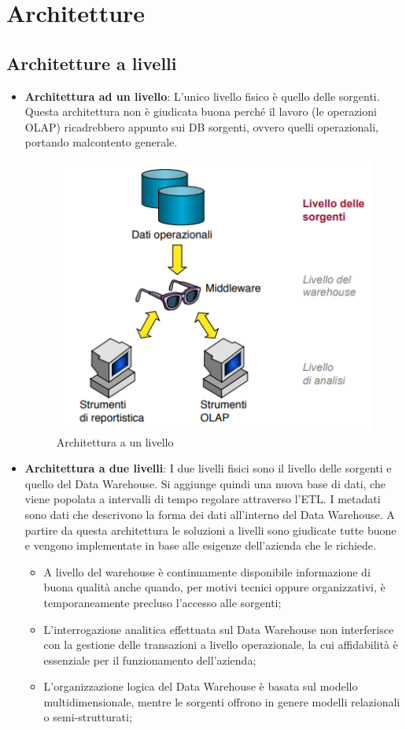 \section{Architetture}
\subsection{Architetture a livelli}
\begin{itemize}
	\item \textbf{Architettura ad un livello}: L'unico livello fisico è quello delle sorgenti. Questa architettura non è giudicata buona perché il lavoro (le operazioni OLAP) ricadrebbero appunto sui DB sorgenti, ovvero quelli operazionali, portando malcontento generale.
	\begin{figure}[H]
		\begin{center}
			\includegraphics[width=0.4\linewidth]{img/onelevel.PNG}
			\caption{Architettura a un livello}
		\end{center}
	\end{figure}
	\item \textbf{Architettura a due livelli}: I due livelli fisici sono il livello delle sorgenti e quello del Data Warehouse. Si aggiunge quindi una nuova base di dati, che viene popolata a intervalli di tempo regolare attraverso l'ETL. I metadati sono dati che descrivono la forma dei dati all'interno del Data Warehouse. A partire da questa architettura le soluzioni a livelli sono giudicate tutte buone e vengono implementate in base alle esigenze dell'azienda che le richiede.
	\begin{itemize}
		\item A livello del warehouse è continuamente disponibile informazione di buona qualità anche quando, per motivi tecnici oppure organizzativi, è temporaneamente precluso l’accesso alle sorgenti;
		\item L’interrogazione analitica effettuata sul Data Warehouse non interferisce con la gestione delle transazioni a livello operazionale, la cui affidabilità è essenziale per il funzionamento dell’azienda;
		\item L’organizzazione logica del Data Warehouse è basata sul modello multidimensionale, mentre le sorgenti offrono in genere modelli relazionali o semi-strutturati;

\end{itemize}
\end{itemize}
